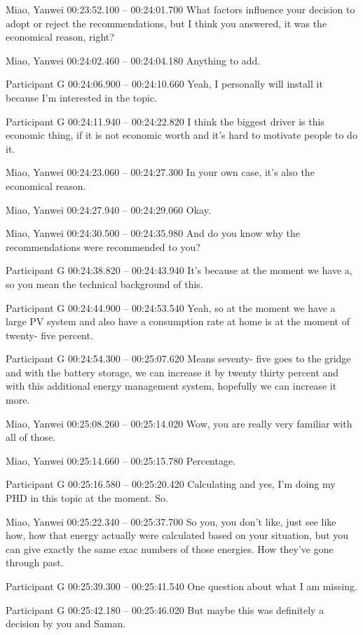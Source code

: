 {Miao, Yanwei 00:23:52.100 -- 00:24:01.700
What factors influence your decision to adopt or reject the recommendations, but I think you answered, it was the economical reason, right?

Miao, Yanwei 00:24:02.460 -- 00:24:04.180
Anything to add.

Participant G 00:24:06.900 -- 00:24:10.660
Yeah, I personally will install it because I'm interested in the topic.

Participant G 00:24:11.940 -- 00:24:22.820
I think the biggest driver is this economic thing, if it is not economic worth and it's hard to motivate people to do it.

Miao, Yanwei 00:24:23.060 -- 00:24:27.300
In your own case, it's also the economical reason.

Miao, Yanwei 00:24:27.940 -- 00:24:29.060
Okay.

Miao, Yanwei 00:24:30.500 -- 00:24:35.980
And do you know why the recommendations were recommended to you?

Participant G 00:24:38.820 -- 00:24:43.940
It's because at the moment we have a, so you mean the technical background of this.

Participant G 00:24:44.900 -- 00:24:53.540
Yeah, so at the moment we have a large PV system and also have a consumption rate at home is at the moment of twenty- five percent.

Participant G 00:24:54.300 -- 00:25:07.620
Means seventy- five goes to the gridge and with the battery storage, we can increase it by twenty thirty percent and with this additional energy management system, hopefully we can increase it more.

Miao, Yanwei 00:25:08.260 -- 00:25:14.020
Wow, you are really very familiar with all of those.

Miao, Yanwei 00:25:14.660 -- 00:25:15.780
Percentage.

Participant G 00:25:16.580 -- 00:25:20.420
Calculating and yes, I'm doing my PHD in this topic at the moment. So.

Miao, Yanwei 00:25:22.340 -- 00:25:37.700
So you, you don't like, just see like how, how that energy actually were calculated based on your situation, but you can give exactly the same exac numbers of those energies. How they've gone through past.

Participant G 00:25:39.300 -- 00:25:41.540
One question about what I am missing.

Participant G 00:25:42.180 -- 00:25:46.020
But maybe this was definitely a decision by you and Saman.

}
